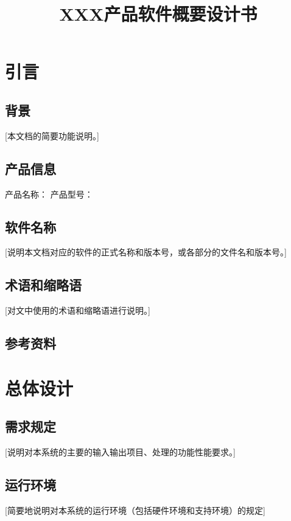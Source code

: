 \documentclass[10pt,a4paper,titlepage]{article} %
\title{XXX产品软件概要设计书}
\author{}
\date{}
\begin{document}
\maketitle

\tableofcontents  %
\clearpage
\section{引言}
\subsection{背景}
[本文档的简要功能说明。]\newline
[简要说明该产品的市场背景和主要特点。]\newline
\subsection{产品信息}
产品名称：\newline
产品型号：\newline
\subsection{软件名称}
[说明本文档对应的软件的正式名称和版本号，或各部分的文件名和版本号。]\newline
\subsection{术语和缩略语}
[对文中使用的术语和缩略语进行说明。]\newline

\subsection{参考资料}

\section{总体设计}
\subsection{需求规定}
[说明对本系统的主要的输入输出项目、处理的功能性能要求。]\newline
\subsection{运行环境}
[简要地说明对本系统的运行环境（包括硬件环境和支持环境）的规定]\newline
\end{document}
